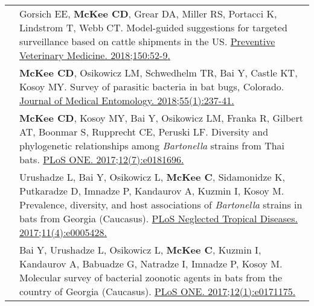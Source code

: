\documentclass[letterpaper]{deedy-resume} %
\newcommand{\spread}{\vspace{1mm}}
\begin{document}
\begin{tabular}{>{\raggedright\arraybackslash}p{2cm}p{16cm}}
2018 & Gorsich EE, \textbf{McKee CD}, Grear DA, Miller RS, Portacci K, Lindstrom T, Webb CT. Model-guided suggestions for targeted surveillance based on cattle shipments in the US. \href{https://doi.org/10.1016/j.prevetmed.2017.12.004}{\textcolor{special}{Preventive Veterinary Medicine. 2018;150:52-9}.} \spread \\

2018 & \textbf{McKee CD}, Osikowicz LM, Schwedhelm TR, Bai Y, Castle KT, Kosoy MY. Survey of parasitic bacteria in bat bugs, Colorado. \href{https://doi.org/10.1093/jme/tjx155}{\textcolor{special}{Journal of Medical Entomology. 2018;55(1):237-41}.} \spread \\

2017 & \textbf{McKee CD}, Kosoy MY, Bai Y, Osikowicz LM, Franka R, Gilbert AT, Boonmar S, Rupprecht CE, Peruski LF. Diversity and phylogenetic relationships among \textit{Bartonella} strains from Thai bats. \href{https://doi.org/10.1371/journal.pone.0181696}{\textcolor{special}{PLoS ONE. 2017;12(7):e0181696}.} \spread \\

2017 & Urushadze L, Bai Y, Osikowicz L, \textbf{McKee C}, Sidamonidze K, Putkaradze D, Imnadze P, Kandaurov A, Kuzmin I, Kosoy M. Prevalence, diversity, and host associations of \textit{Bartonella} strains in bats from Georgia (Caucasus). \href{https://doi.org/10.1371/journal.pntd.0005428}{\textcolor{special}{PLoS Neglected Tropical Diseases. 2017;11(4):e0005428}.} \spread \\

2017 & Bai Y, Urushadze L, Osikowicz L, \textbf{McKee C}, Kuzmin I, Kandaurov A, Babuadze G, Natradze I, Imnadze P, Kosoy M. Molecular survey of bacterial zoonotic agents in bats from the country of Georgia (Caucasus). \href{https://doi.org/10.1371/journal.pone.0171175}{\textcolor{special}{PLoS ONE. 2017;12(1):e0171175}.} \spread \\


\end{tabular}
\end{document}
